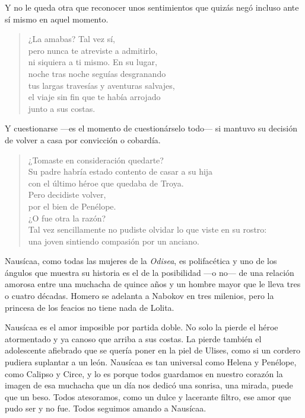 Y no le queda otra que reconocer unos sentimientos que quizás negó incluso ante sí mismo en aquel momento.

\begin{verse}
¿La amabas? Tal vez sí,\\
pero nunca te atreviste a admitirlo,\\
ni siquiera a ti mismo. En su lugar,\\
noche tras noche seguías desgranando\\
tus largas travesías y aventuras salvajes,\\
el viaje sin fin que te había arrojado\\
junto a sus costas.
\end{verse}

Y cuestionarse ---es el momento de cuestionárselo todo--- si mantuvo su decisión de volver a casa por convicción o cobardía.

\begin{verse}
¿Tomaste en consideración quedarte?\\
Su padre habría estado contento de casar a su hija\\
con el último héroe que quedaba de Troya.\\
Pero decidiste volver,\\
por el bien de Penélope.\\
¿O fue otra la razón?\\
Tal vez sencillamente no pudiste olvidar lo que viste en su rostro:\\
una joven sintiendo compasión por un anciano.
\end{verse}

Nausícaa, como todas las mujeres de la \emph{Odisea}, es polifacética y uno de los ángulos que muestra su historia es el de la posibilidad ---o no--- de una relación amorosa entre una muchacha de quince años y un hombre mayor que le lleva tres o cuatro décadas. Homero se adelanta a Nabokov en tres milenios, pero la princesa de los feacios no tiene nada de Lolita.

Nausícaa es el amor imposible por partida doble. No solo la pierde el héroe atormentado y ya canoso que arriba a sus costas. La pierde también el adolescente afiebrado que se quería poner en la piel de Ulises, como si un cordero pudiera suplantar a un león. Nausícaa es tan universal como Helena y Penélope, como Calipso y Circe, y lo es porque todos guardamos en nuestro corazón la imagen de esa muchacha que un día nos dedicó una sonrisa, una mirada, puede que un beso. Todos atesoramos, como un dulce y lacerante filtro, ese amor que pudo ser y no fue. Todos seguimos amando a Nausícaa.
